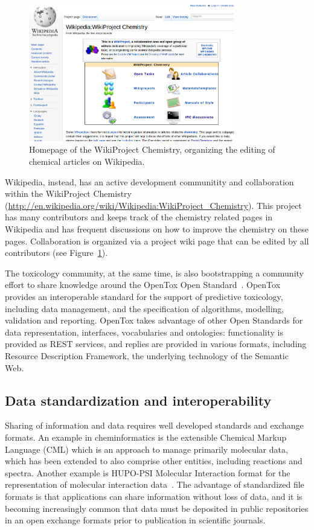 \documentclass[12pt]{book}
\begin{document}
\begin{figure}
\begin{center}
\includegraphics[width=0.8\textwidth]{graphics/wikichemistry}
\end{center}
\caption{Homepage of the WikiProject Chemistry, organizing the
editing of chemical articles on Wikipedia.}
\label{fig:wikichem}
\end{figure}

Wikipedia, instead, has an active development communitity and
collaboration within the WikiProject Chemistry
(\url{http://en.wikipedia.org/wiki/Wikipedia:WikiProject_Chemistry}).
This project has many contributors and keeps track of the chemistry
related pages in Wikipedia and has frequent discussions on how
to improve the chemistry on these pages. Collaboration is organized
via a project wiki page that can be edited by all contributors
(see Figure~\ref{fig:wikichem}).

The toxicology community, at the same time, is also bootstrapping
a community effort to share knowledge around the OpenTox Open Standard~\cite{Hardy2010}.
OpenTox provides an interoperable standard for the support of predictive toxicology,
including data management, and the specification of algorithms, modelling, validation and
reporting. OpenTox takes advantage of other Open Standards for data representation,
interfaces, vocabularies and ontologies: functionality is provided as REST services,
and replies are provided in various formats, including Resource Description Framework,
the underlying technology of the Semantic Web.

\subsection{Data standardization and interoperability}

Sharing of information and data requires well developed standards and exchange formats.
An example in cheminformatics is the extensible Chemical Markup Language (CML) which
is an approach to manage primarily molecular data, which has been extended to also
comprise other entities, including reactions and spectra. Another example is HUPO-PSI
Molecular Interaction format for the representation of molecular interaction
data~\cite{Orchard:2010uq}. The advantage of standardized file formats is that
applications can share information without loss of data, and it is becoming
increasingly common that data must be deposited in public repositories in an
open exchange formats prior to publication in scientific journals.
\end{document}
